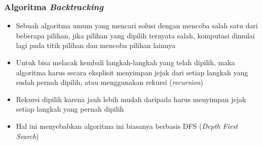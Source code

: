 \documentclass{beamer}
\begin{document}
\begin{frame}
\frametitle{Algoritma \protect\textit{Backtracking}}
\begin{itemize}
\item Sebuah algoritma umum yang mencari solusi dengan mencoba salah satu dari beberapa pilihan, jika pilihan yang dipilih ternyata salah, komputasi dimulai lagi pada titik pilihan dan mencoba pilihan lainnya
\item Untuk bisa melacak kembali langkah-langkah yang telah dipilih, maka algoritma harus secara eksplisit menyimpan jejak dari setiap langkah yang sudah pernah dipilih, atau menggunakan rekursi (\textit{recursion})
\item Rekursi dipilih karena jauh lebih mudah daripada harus menyimpan jejak setiap langkah yang pernah dipilih
\item Hal ini menyebabkan algoritma ini biasanya berbasis DFS (\textit{Depth First Search})
\end{itemize}
\end{frame}

\end{document}
